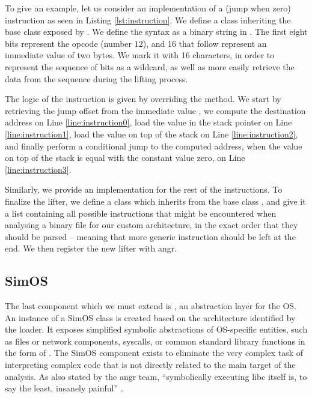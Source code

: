 To give an example, let us consider an implementation of a  (jump when zero) instruction as seen in Listing \ref{lst:instruction}. We define a class inheriting the base  class exposed by . We define the syntax as a binary string in . The first eight bits represent the opcode (number $12$), and 16 that follow represent an immediate value of two bytes. We mark it with 16  characters, in order to represent the sequence of bits as a wildcard, as well as more easily retrieve the data from the sequence during the lifting process. 

The logic of the instruction is given by overriding the  method. We start by retrieving the jump offset from the immediate value , we compute the destination address on Line \ref{line:instruction0}, load the value in the stack pointer on Line \ref{line:instruction1}, load the value on top of the stack on Line \ref{line:instruction2}, and finally perform a conditional jump to the computed address, when the value on top of the stack is equal with the constant value zero, on Line \ref{line:instruction3}.

Similarly, we provide an implementation for the rest of the instructions. To finalize the lifter, we define a class which inherits from the base class , and give it a list containing all possible instructions that might be encountered when analysing a binary file for our custom architecture, in the exact order that they should be parsed -- meaning that more generic instruction should be left at the end. We then register the new lifter with angr.

\subsection{SimOS}

The last component which we must extend is , an abstraction layer for the \gls{OS}. An instance of a SimOS class is created based on the architecture identified by the loader. It exposes simplified symbolic abstractions of \gls{OS}-specific entities, such as files or network components, \glspl{syscall}, or common standard library functions in the form of  \cite{angr_tut}. The SimOS component exists to eliminate the very complex task of interpreting complex code that is not directly related to the main target of the analysis. As also stated by the angr team, ``symbolically executing libc itself is, to say the least, insanely painful'' \cite{angr_tut}. 

